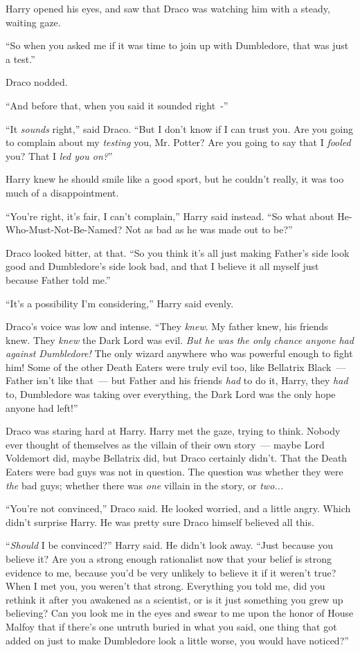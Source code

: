Harry opened his eyes, and saw that Draco was watching him with a steady, waiting gaze.

``So when you asked me if it was time to join up with Dumbledore, that was just a test.''

Draco nodded.

``And before that, when you said it sounded right~-''

``It \emph{sounds} right,'' said Draco. ``But I don't know if I can trust you. Are you going to complain about my \emph{testing} you, Mr. Potter? Are you going to say that I \emph{fooled} you? That I \emph{led you on?}''

Harry knew he should smile like a good sport, but he couldn't really, it was too much of a disappointment.

``You're right, it's fair, I can't complain,'' Harry said instead. ``So what about He-Who-Must-Not-Be-Named? Not as bad as he was made out to be?''

Draco looked bitter, at that. ``So you think it's all just making Father's side look good and Dumbledore's side look bad, and that I believe it all myself just because Father told me.''

``It's a possibility I'm considering,'' Harry said evenly.

Draco's voice was low and intense. ``They \emph{knew}. My father knew, his friends knew. They \emph{knew} the Dark Lord was evil. \emph{But he was the only chance anyone had against Dumbledore!} The only wizard anywhere who was powerful enough to fight him! Some of the other Death Eaters were truly evil too, like Bellatrix Black~--- Father isn't like that~--- but Father and his friends \emph{had} to do it, Harry, they \emph{had} to, Dumbledore was taking over everything, the Dark Lord was the only hope anyone had left!''

Draco was staring hard at Harry. Harry met the gaze, trying to think. Nobody ever thought of themselves as the villain of their own story~--- maybe Lord Voldemort did, maybe Bellatrix did, but Draco certainly didn't. That the Death Eaters were bad guys was not in question. The question was whether they were \emph{the} bad guys; whether there was \emph{one} villain in the story, or \emph{two...}

``You're not convinced,'' Draco said. He looked worried, and a little angry. Which didn't surprise Harry. He was pretty sure Draco himself believed all this.

``\emph{Should} I be convinced?'' Harry said. He didn't look away. ``Just because you believe it? Are you a strong enough rationalist now that your belief is strong evidence to me, because you'd be very unlikely to believe it if it weren't true? When I met you, you weren't that strong. Everything you told me, did you rethink it after you awakened as a scientist, or is it just something you grew up believing? Can you look me in the eyes and swear to me upon the honor of House Malfoy that if there's one untruth buried in what you said, one thing that got added on just to make Dumbledore look a little worse, you would have noticed?''


